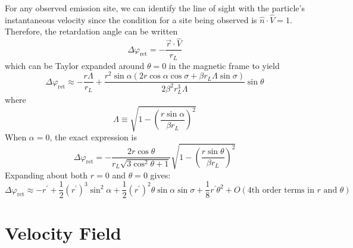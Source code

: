 \documentclass{book}
\newcommand{\phase}{\varphi}
\begin{document}
For any observed emission site, we can identify the line of sight with the particle's instantaneous velocity since the condition for a site being observed is $\hat{n}\cdot\hat{V} = 1$.
Therefore, the retardation angle can be written
\begin{equation}
    \Delta\phase_\text{ret} = -\frac{\vec{r}\cdot\hat{V}}{r_L}
\end{equation}
which can be Taylor expanded around $\theta = 0$ in the magnetic frame to yield
\begin{equation}
    \Delta\phase_\text{ret} \approx
        -\frac{r\Lambda}{r_L} + \frac{r^2\sin\alpha(2r\cos\alpha\cos\sigma + \beta r_L \Lambda \sin\sigma)}{2\beta^2 r_L^3 \Lambda} \sin\theta
\end{equation}
where
\begin{equation}
    \Lambda \equiv \sqrt{1-\left(\frac{r\sin\alpha}{\beta r_L}\right)^2}
\end{equation}
When $\alpha = 0$, the exact expression is
\begin{equation}
    \Delta\phase_\text{ret} = -\frac{2r\cos\theta}{r_L\sqrt{3\cos^2\theta+1}}
        \sqrt{1 - \left(\frac{r\sin\theta}{\beta r_L}\right)^2}
\end{equation}
Expanding about both $r = 0$ and $\theta = 0$ gives:
\begin{equation}
    \Delta\phase_\text{ret} \approx
        -r^\prime +
        \frac12(r^\prime)^3\sin^2\alpha +
        \frac12(r^\prime)^2\theta\sin\alpha\sin\sigma +
        \frac18 r^\prime\theta^2 +
        O(\text{4th order terms in $r$ and $\theta$})
\end{equation}

\section{Velocity Field}
\label{sec:vfield}
\end{document}
